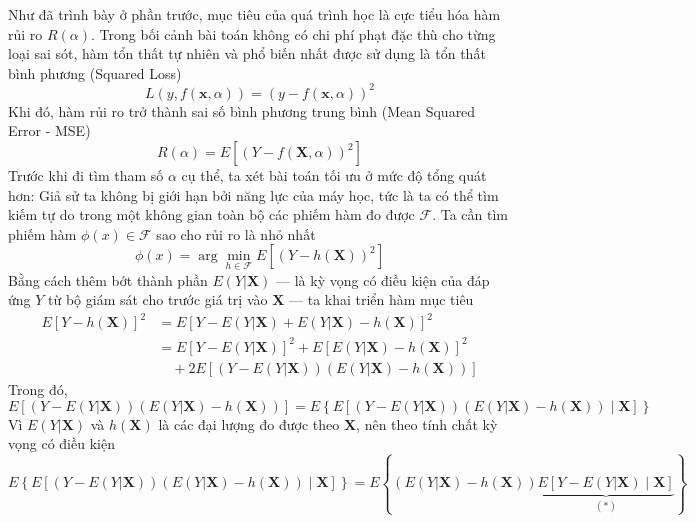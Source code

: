 \hspace*{0.5cm}Như đã trình bày ở phần trước, mục tiêu của quá trình học là cực tiểu hóa hàm rủi ro $R(\alpha)$. Trong bối cảnh bài toán không có chi phí phạt đặc thù cho từng loại sai sót, hàm tổn thất tự nhiên và phổ biến nhất được sử dụng là tổn thất bình phương (Squared Loss)
\begin{equation*}
	L(y, f(\bm{x}, \alpha)) = (y - f(\bm{x}, \alpha))^2
\end{equation*}
Khi đó, hàm rủi ro trở thành sai số bình phương trung bình (Mean Squared Error - MSE)
\begin{equation*}
	R(\alpha) = E\left[(Y - f(\bm{X}, \alpha))^2\right]
\end{equation*}
Trước khi đi tìm tham số $\alpha$ cụ thể, ta xét bài toán tối ưu ở mức độ tổng quát hơn: Giả sử ta không bị giới hạn bởi năng lực của máy học, tức là ta có thể tìm kiếm tự do trong một không gian toàn bộ các phiếm hàm đo được $\mathcal{F}$. Ta cần tìm phiếm hàm $\phi(x) \in \mathcal{F}$ sao cho rủi ro là nhỏ nhất
\begin{equation*}
	\phi(x) = \arg\min_{h \in \mathcal{F}} E\left[(Y - h(\bm{X}))^2\right]
\end{equation*}
Bằng cách thêm bớt thành phần $E(Y|\bm{X})$ — là kỳ vọng có điều kiện của đáp ứng $Y$ từ bộ giám sát cho trước giá trị vào $\bm{X}$ — ta khai triển hàm mục tiêu
\begin{align*}
	E\left[Y - h(\bm{X})\right]^2 &= E\left[Y - E(Y|\bm{X}) + E(Y|\bm{X}) - h(\bm{X})\right]^2 \nonumber \\
	&= E\left[Y - E(Y|\bm{X})\right]^2 + E\left[E(Y|\bm{X}) - h(\bm{X})\right]^2 \nonumber \\
	& \quad + 2E\left[\left(Y - E(Y|\bm{X})\right)\left(E(Y|\bm{X}) - h(\bm{X})\right)\right]
\end{align*}
Trong đó,
\begin{equation*}
	E\left[\left(Y - E(Y|\bm{X})\right)\left(E(Y|\bm{X}) - h(\bm{X})\right)\right] = E\left\{ E\left[ \left(Y - E(Y|\bm{X})\right)\left(E(Y|\bm{X}) - h(\bm{X})\right) \mid \bm{X} \right] \right\}
\end{equation*}
Vì $E(Y|\bm{X})$ và $h(\bm{X})$ là các đại lượng đo được theo $\bm{X}$, nên theo tính chất kỳ vọng có điều kiện
\begin{equation*}
	E\left\{ E\left[ \left(Y - E(Y|\bm{X})\right)\left(E(Y|\bm{X}) - h(\bm{X})\right) \mid \bm{X} \right] \right\} = E\left\{ \left(E(Y|\bm{X}) - h(\bm{X})\right) \underbrace{E\left[ Y - E(Y|\bm{X}) \mid \bm{X} \right]}_{(*)} \right\}
\end{equation*}
